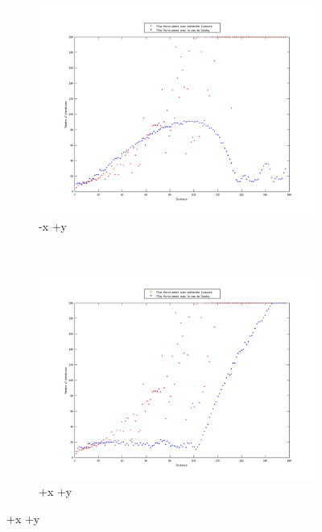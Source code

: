 \documentclass[11pt,a4paper,twoside,onecolumn,titlepage]{report}
\begin{document}
\begin{enumerate}[(a)]
\begin{figure}[h!]
    \centering
	\begin{subfigure}[t]{0.5\textwidth}
		\centering
		\includegraphics[scale=0.4]{steps-quarter-4}
		\caption{-x +y}
		\label{fig:awesome_image}
	\end{subfigure}%
        ~ %
    \begin{subfigure}[t]{0.5\textwidth}
		\centering
		\includegraphics[scale=0.4]{steps-quarter-3}
		\caption{+x +y}
		\label{fig:awesome_image}
	\end{subfigure}


\end{figure}
\end{enumerate}
\end{document}
